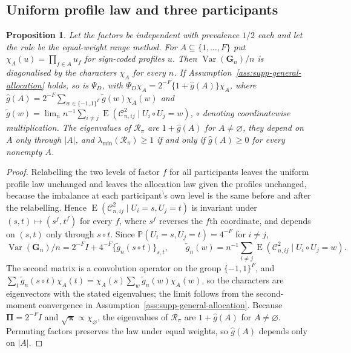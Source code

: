 \documentclass[12pt,a4paper]{article}
\newtheorem{proposition}{Proposition}
\theoremstyle{definition}
\theoremstyle{remark}\newtheorem{remark}{Remark}
\numberwithin{equation}{section}
\newcommand{\E}{\operatorname{E}}
\newcommand{\Pp}{\mathbb P}
\newcommand{\Var}{\operatorname{Var}}
\begin{document}
\subsection{Uniform profile law and three participants}
\begin{proposition}\label{prop:supp-walsh}
Let the factors be independent with prevalence $1/2$ each and let the rule be the equal-weight range method. For $A\subseteq\{1,\ldots,F\}$ put $\chi_A(u)=\prod_{f\in A}u_f$ for sign-coded profiles $u$. Then $\Var(\bm G_n)/n$ is diagonalised by the characters $\chi_A$ for every $n$. If Assumption~\ref{ass:supp-general-allocation} holds, so is $\Psi_D$, with $\Psi_D\chi_A=2^{-F}\{1+\widehat g(A)\}\chi_A$, where $\widehat g(A)=2^{-F}\sum_{w\in\{-1,1\}^F}\widetilde g(w)\chi_A(w)$ and $\widetilde g(w)=\lim_nn^{-1}\sum_{i\ne j}\E(\mathcal C_{n,ij}^2\mid U_i\circ U_j=w)$, $\circ$ denoting coordinatewise multiplication. The eigenvalues of $\mathcal R_\pi$ are $1+\widehat g(A)$ for $A\ne\varnothing$, they depend on $A$ only through $|A|$, and $\lambda_{\min}(\mathcal R_\pi)\ge1$ if and only if $\widehat g(A)\ge0$ for every nonempty $A$.
\end{proposition}
\begin{proof}
Relabelling the two levels of factor $f$ for all participants leaves the uniform profile law unchanged and leaves the allocation law given the profiles unchanged, because the imbalance at each participant's own level is the same before and after the relabelling. Hence $\E(\mathcal C_{n,ij}^2\mid U_i=s,U_j=t)$ is invariant under $(s,t)\mapsto(s^f,t^f)$ for every $f$, where $s^f$ reverses the $f$th coordinate, and depends on $(s,t)$ only through $s\circ t$. Since $\Pp(U_i=s,U_j=t)=4^{-F}$ for $i\ne j$,
\[
 \Var(\bm G_n)/n=2^{-F}I+4^{-F}\{\widetilde g_n(s\circ t)\}_{s,t},\qquad
 \widetilde g_n(w)=n^{-1}\sum_{i\ne j}\E(\mathcal C_{n,ij}^2\mid U_i\circ U_j=w).
\]
The second matrix is a convolution operator on the group $\{-1,1\}^F$, and
$\sum_t\widetilde g_n(s\circ t)\chi_A(t)=\chi_A(s)\sum_w\widetilde g_n(w)\chi_A(w)$, so the characters are eigenvectors with the stated eigenvalues; the limit follows from the second-moment convergence in Assumption~\ref{ass:supp-general-allocation}. Because $\bm\Pi=2^{-F}I$ and $\sqrt{\bm\pi}\propto\chi_\varnothing$, the eigenvalues of $\mathcal R_\pi$ are $1+\widehat g(A)$ for $A\ne\varnothing$. Permuting factors preserves the law under equal weights, so $\widehat g(A)$ depends only on $|A|$.
\end{proof}
\end{document}
